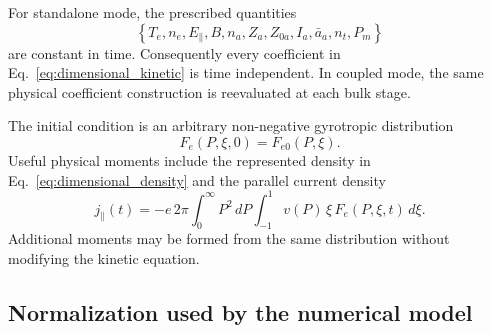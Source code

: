 \documentclass[11pt]{article}
\begin{document}
For standalone mode, the prescribed quantities
\begin{equation}
 \left\{T_e,n_e,E_\parallel,B,n_a,Z_a,Z_{0a},I_a,\bar a_a,n_t,P_m\right\}
\end{equation}
are constant in time.  Consequently every coefficient in
Eq.~\eqref{eq:dimensional_kinetic} is time independent.  In coupled mode, the same
physical coefficient construction is reevaluated at each bulk stage.

The initial condition is an arbitrary non-negative gyrotropic distribution
\begin{equation}
 F_e(P,\xi,0)=F_{e0}(P,\xi).
 \label{eq:dimensional_initial_condition}
\end{equation}
Useful physical moments include the represented density in
Eq.~\eqref{eq:dimensional_density} and the parallel current density
\begin{equation}
 j_\parallel(t)
 =-e\,2\pi\int_0^\infty P^2\,dP\int_{-1}^{1}
  v(P)\,\xi\,F_e(P,\xi,t)\,d\xi.
 \label{eq:dimensional_current}
\end{equation}
Additional moments may be formed from the same distribution without modifying the
kinetic equation.

\subsection{Normalization used by the numerical model}
\label{sec:normalization}
\end{document}
